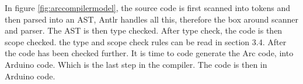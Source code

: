 In figure \ref{fig:arccompilermodel}, the source code is first scanned into tokens and then parsed into an AST, Antlr handles all this, therefore the box around scanner and parser. The AST is then type checked. After type check, the code is then scope checked. the type and scope check rules can be read in section 3.4. After the code has been checked further. It is time to code generate the Arc code, into Arduino code. Which is the last step in the compiler. The code is then in Arduino code.  
